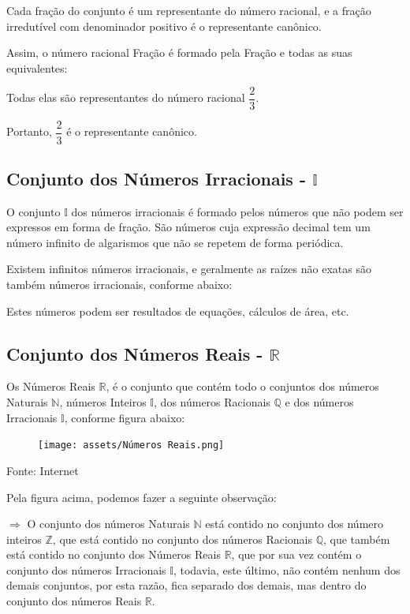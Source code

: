 \begin{multicols*}{2}
	Cada fração do conjunto é um representante do número racional, e a fração irredutível com denominador positivo é o representante canônico.

	Assim, o número racional Fração é formado pela Fração e todas as suas equivalentes:

	Todas elas são representantes do número racional $\dfrac{2}{3} $.

	Portanto, $ \dfrac{2}{3} $ é o representante canônico.\\

	\subsection{Conjunto dos Números Irracionais - $\mathbb{I}$}

	O conjunto $\mathbb{I}$ dos números irracionais é formado pelos números que não podem ser expressos em forma de fração. São números cuja expressão decimal tem um número infinito de algarismos que não se repetem de forma periódica.

	Existem infinitos números irracionais, e geralmente as raízes não exatas são também números irracionais, conforme abaixo:


	Estes números podem ser resultados de equações, cálculos de área, etc.

	\subsection{Conjunto dos Números Reais - $\mathbb{R}$}

	Os Números Reais $\mathbb{R}$, é o conjunto que contém todo o conjuntos dos números Naturais $\mathbb{N}$, números Inteiros $\mathbb{I}$, dos números Racionais $\mathbb{Q}$ e dos números Irracionais $\mathbb{I}$, conforme figura abaixo:

	\begin{figure}[H]
		\centering
		\texttt{[image: assets/Números Reais.png]}
	\end{figure}

	Fonte: Internet

	Pela figura acima, podemos fazer a seguinte observação:

	$\Rightarrow$ O conjunto dos números Naturais $\mathbb{N}$ está contido no conjunto dos número inteiros $\mathbb{Z}$, que está contido no conjunto dos números Racionais $\mathbb{Q}$, que também está contido no conjunto dos Números Reais $\mathbb{R}$, que por sua vez contém o conjunto dos números Irracionais $\mathbb{I}$, todavia, este último, não contém nenhum dos demais conjuntos, por esta razão, fica separado dos demais, mas dentro do conjunto dos números Reais $\mathbb{R}$.


\end{multicols*}
